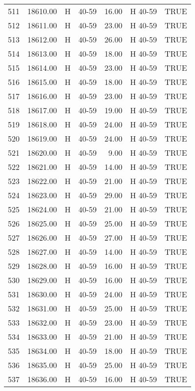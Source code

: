 \begin{table}[ht]
\begin{tabular}{rrllrll}
  511 & 18610.00 & H & 40-59 & 16.00 & H 40-59 & TRUE \\ 
  512 & 18611.00 & H & 40-59 & 23.00 & H 40-59 & TRUE \\ 
  513 & 18612.00 & H & 40-59 & 26.00 & H 40-59 & TRUE \\ 
  514 & 18613.00 & H & 40-59 & 18.00 & H 40-59 & TRUE \\ 
  515 & 18614.00 & H & 40-59 & 23.00 & H 40-59 & TRUE \\ 
  516 & 18615.00 & H & 40-59 & 18.00 & H 40-59 & TRUE \\ 
  517 & 18616.00 & H & 40-59 & 23.00 & H 40-59 & TRUE \\ 
  518 & 18617.00 & H & 40-59 & 19.00 & H 40-59 & TRUE \\ 
  519 & 18618.00 & H & 40-59 & 24.00 & H 40-59 & TRUE \\ 
  520 & 18619.00 & H & 40-59 & 24.00 & H 40-59 & TRUE \\ 
  521 & 18620.00 & H & 40-59 & 9.00 & H 40-59 & TRUE \\ 
  522 & 18621.00 & H & 40-59 & 14.00 & H 40-59 & TRUE \\ 
  523 & 18622.00 & H & 40-59 & 21.00 & H 40-59 & TRUE \\ 
  524 & 18623.00 & H & 40-59 & 29.00 & H 40-59 & TRUE \\ 
  525 & 18624.00 & H & 40-59 & 21.00 & H 40-59 & TRUE \\ 
  526 & 18625.00 & H & 40-59 & 25.00 & H 40-59 & TRUE \\ 
  527 & 18626.00 & H & 40-59 & 27.00 & H 40-59 & TRUE \\ 
  528 & 18627.00 & H & 40-59 & 14.00 & H 40-59 & TRUE \\ 
  529 & 18628.00 & H & 40-59 & 16.00 & H 40-59 & TRUE \\ 
  530 & 18629.00 & H & 40-59 & 16.00 & H 40-59 & TRUE \\ 
  531 & 18630.00 & H & 40-59 & 24.00 & H 40-59 & TRUE \\ 
  532 & 18631.00 & H & 40-59 & 25.00 & H 40-59 & TRUE \\ 
  533 & 18632.00 & H & 40-59 & 23.00 & H 40-59 & TRUE \\ 
  534 & 18633.00 & H & 40-59 & 21.00 & H 40-59 & TRUE \\ 
  535 & 18634.00 & H & 40-59 & 18.00 & H 40-59 & TRUE \\ 
  536 & 18635.00 & H & 40-59 & 25.00 & H 40-59 & TRUE \\ 
  537 & 18636.00 & H & 40-59 & 16.00 & H 40-59 & TRUE \\ 

\end{tabular}
\end{table}
